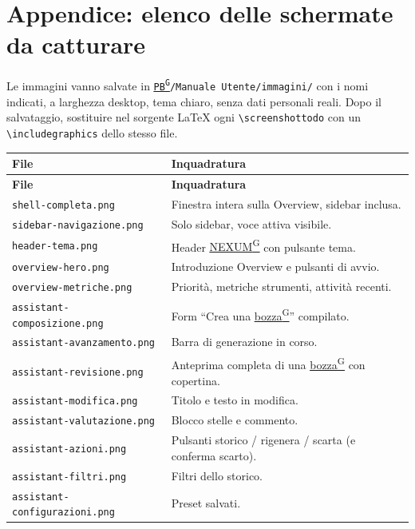 \documentclass[a4paper,12pt]{article}
\providecommand{\glslink}[2]{\href{https://alittlebyte-19.github.io/Documentazione/glossario.html\#gls-#1}{\underline{#2}\textsuperscript{\scriptsize G}}}
\begin{document}
\section{Appendice: elenco delle schermate da catturare}

Le immagini vanno salvate in \texttt{\glslink{pb-product-baseline}{PB}/Manuale Utente/immagini/} con i nomi indicati, a larghezza desktop, tema chiaro, senza dati personali reali. Dopo il salvataggio, sostituire nel sorgente \LaTeX{} ogni \texttt{\textbackslash screenshottodo} con un \texttt{\textbackslash includegraphics} dello stesso file.

\begin{center}
\renewcommand{\arraystretch}{1.25}
{\footnotesize
\begin{longtable}{|p{5.4cm}|p{9.0cm}|}
\hline
\rowcolor{gray!20}
\textbf{File} & \textbf{Inquadratura} \\
\hline
\endfirsthead
\hline
\rowcolor{gray!20}
\textbf{File} & \textbf{Inquadratura} \\
\hline
\endhead
\texttt{shell-completa.png} & Finestra intera sulla Overview, sidebar inclusa. \\
\hline
\texttt{sidebar-navigazione.png} & Solo sidebar, voce attiva visibile. \\
\hline
\texttt{header-tema.png} & Header \glslink{nexum}{NEXUM} con pulsante tema. \\
\hline
\texttt{overview-hero.png} & Introduzione Overview e pulsanti di avvio. \\
\hline
\texttt{overview-metriche.png} & Priorità, metriche strumenti, attività recenti. \\
\hline
\texttt{assistant-composizione.png} & Form ``Crea una \glslink{bozza-draft}{bozza}'' compilato. \\
\hline
\texttt{assistant-avanzamento.png} & Barra di generazione in corso. \\
\hline
\texttt{assistant-revisione.png} & Anteprima completa di una \glslink{bozza-draft}{bozza} con copertina. \\
\hline
\texttt{assistant-modifica.png} & Titolo e testo in modifica. \\
\hline
\texttt{assistant-valutazione.png} & Blocco stelle e commento. \\
\hline
\texttt{assistant-azioni.png} & Pulsanti storico / rigenera / scarta (e conferma scarto). \\
\hline
\texttt{assistant-filtri.png} & Filtri dello storico. \\
\hline
\texttt{assistant-configurazioni.png} & Preset salvati. \\

\end{longtable}}
\end{center}
\end{document}
